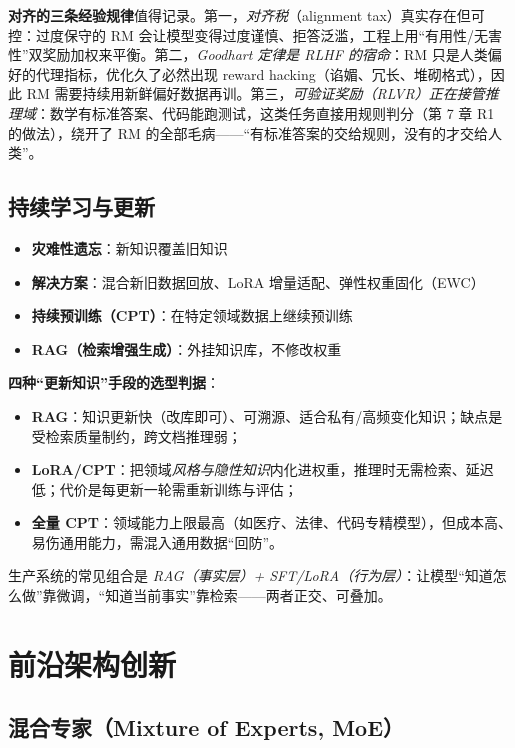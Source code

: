 \documentclass[12pt,a4paper]{article}
\begin{document}
\textbf{对齐的三条经验规律}值得记录。第一，\emph{对齐税}（alignment tax）真实存在但可控：过度保守的 RM 会让模型变得过度谨慎、拒答泛滥，工程上用“有用性/无害性”双奖励加权来平衡。第二，\emph{Goodhart 定律是 RLHF 的宿命}：RM 只是人类偏好的代理指标，优化久了必然出现 reward hacking（谄媚、冗长、堆砌格式），因此 RM 需要持续用新鲜偏好数据再训。第三，\emph{可验证奖励（RLVR）正在接管推理域}：数学有标准答案、代码能跑测试，这类任务直接用规则判分（第 7 章 R1 的做法），绕开了 RM 的全部毛病——“有标准答案的交给规则，没有的才交给人类”。

\subsection{持续学习与更新}

\begin{itemize}
  \item \textbf{灾难性遗忘}：新知识覆盖旧知识
  \item \textbf{解决方案}：混合新旧数据回放、LoRA 增量适配、弹性权重固化（EWC）
  \item \textbf{持续预训练（CPT）}：在特定领域数据上继续预训练
  \item \textbf{RAG（检索增强生成）}：外挂知识库，不修改权重
\end{itemize}

\textbf{四种“更新知识”手段的选型判据}：
\begin{itemize}
  \item \textbf{RAG}：知识更新快（改库即可）、可溯源、适合私有/高频变化知识；缺点是受检索质量制约，跨文档推理弱；
  \item \textbf{LoRA/CPT}：把领域\emph{风格与隐性知识}内化进权重，推理时无需检索、延迟低；代价是每更新一轮需重新训练与评估；
  \item \textbf{全量 CPT}：领域能力上限最高（如医疗、法律、代码专精模型），但成本高、易伤通用能力，需混入通用数据“回防”。
\end{itemize}
生产系统的常见组合是 \emph{RAG（事实层）+ SFT/LoRA（行为层）}：让模型“知道怎么做”靠微调，“知道当前事实”靠检索——两者正交、可叠加。

\section{前沿架构创新}

\subsection{混合专家（Mixture of Experts, MoE）}
\end{document}
